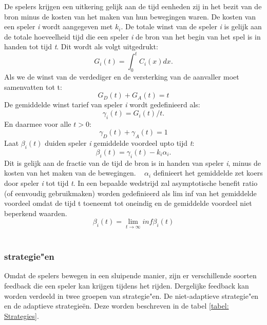 \documentclass[master=cws, masteroption=vs]{kulemt}
\begin{document}
\begin{abstract*}
De spelers krijgen een uitkering gelijk aan de tijd eenheden zij in het bezit van de bron minus de kosten van het maken van hun bewegingen waren. De kosten van een speler \textit{i} wordt aangegeven met $ k_{i} $.
De totale winst van de speler \textit{i} is gelijk aan de totale hoeveelheid tijd die een speler \textit{i} de bron van het begin van het spel is in handen tot tijd \textit{t}. Dit wordt als volgt uitgedrukt:
\begin{equation}
G_{i}(t) = \int_0^t \! C_{i}(x) dx.
\end{equation}
Als we de winst van de verdediger en de versterking van de aanvaller moet samenvatten tot t:
\begin{equation} 
G_{D}(t) + G_{A}(t) = t
\end{equation}
De gemiddelde winst tarief van speler \textit{i} wordt gedefinieerd als:
\begin{equation}
\gamma_{i}(t) = G_{i}(t) / t.
\end{equation}
En daarmee voor alle $ t> 0 $:
\begin{equation} 
\gamma_{D}(t) + \gamma_{A}(t) = 1
\end{equation}
Laat $ \beta_{i}(t) $ duiden speler \textit{i} gemiddelde voordeel upto tijd \textit{t}:
\begin{equation}
\beta_{i}(t) = \gamma_{i}(t) - k_{i} \alpha_{i}.
\end{equation}
Dit is gelijk aan de fractie van de tijd de bron is in handen van speler \textit{i}, minus de kosten van het maken van de bewegingen. ~ $ \alpha_{i} $ definieert het gemiddelde zet koers door speler \textit{i} tot tijd \textit{t}.
In een bepaalde wedstrijd zal asymptotische benefit ratio (of eenvoudig gebruikmaken) worden gedefinieerd als lim inf van het gemiddelde voordeel omdat de tijd t toeneemt tot oneindig en de gemiddelde voordeel niet beperkend waarden.
\begin{equation}
\beta_{i} (t) = \lim_{t \to \infty } inf \beta_{i}(t)
\end{equation}
\\


\subsubsection{strategie"en}
Omdat de spelers bewegen in een sluipende manier, zijn er verschillende soorten feedback die een speler kan krijgen tijdens het rijden. Dergelijke feedback kan worden verdeeld in twee groepen van strategie"en. De niet-adaptieve strategie"en en de adaptieve strategie\"en. Deze worden beschreven in de tabel \ref{tabel: Strategies}. \\


\end{abstract*}
\end{document}
